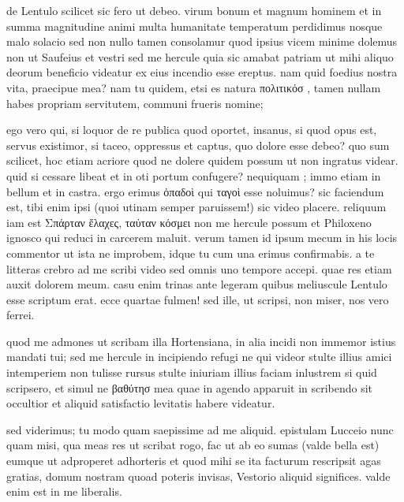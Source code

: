 


 de Lentulo scilicet sic fero ut debeo. virum bonum et magnum hominem et in summa magnitudine animi multa humanitate temperatum perdidimus nosque malo solacio sed non nullo tamen consolamur quod ipsius vicem minime dolemus non ut Saufeius et vestri sed me hercule quia sic amabat patriam ut mihi aliquo deorum beneficio videatur ex eius incendio esse ereptus. nam quid foedius nostra vita, praecipue mea? nam tu quidem, etsi es natura πολιτικόσ , tamen nullam habes propriam servitutem, communi frueris nomine;

 ego vero qui, si loquor de re publica quod oportet, insanus, si quod opus est, servus existimor, si taceo, oppressus et captus, quo dolore esse debeo? quo sum scilicet, hoc etiam acriore quod ne dolere quidem possum ut non ingratus videar. quid si cessare libeat et in oti portum confugere? nequiquam ; immo etiam in bellum et in castra. ergo erimus ὀπαδοὶ qui ταγοὶ esse noluimus? sic faciendum est, tibi enim ipsi (quoi utinam semper paruissem!) sic video placere. reliquum iam est Σπάρταν ἔλαχες, ταύταν κόσμει non me hercule possum et Philoxeno ignosco qui reduci in carcerem maluit. verum tamen id ipsum mecum in his locis commentor ut ista ne improbem, idque tu cum una erimus confirmabis. a te litteras crebro ad me scribi video sed omnis uno tempore accepi. quae res etiam auxit dolorem meum. casu enim trinas ante legeram quibus meliuscule Lentulo esse scriptum erat. ecce quartae fulmen! sed ille, ut scripsi, non miser, nos vero ferrei.

 quod me admones ut scribam illa Hortensiana, in alia incidi non immemor istius mandati tui; sed me hercule in incipiendo refugi ne qui videor stulte illius amici intemperiem non tulisse rursus stulte iniuriam illius faciam inlustrem si quid scripsero, et simul ne βαθύτησ mea quae in agendo apparuit in scribendo sit occultior et aliquid satisfactio levitatis habere videatur.

 sed viderimus; tu modo quam saepissime ad me aliquid. epistulam Lucceio nunc quam misi, qua meas res ut scribat rogo, fac ut ab eo sumas (valde bella est) eumque ut adproperet adhorteris et quod mihi se ita facturum rescripsit agas gratias, domum nostram quoad poteris invisas, Vestorio aliquid significes. valde enim est in me liberalis.
